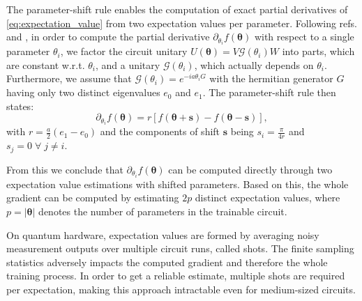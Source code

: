 The parameter-shift rule enables the computation of exact partial derivatives of \cref{eq:expectation_value} from two expectation values per parameter.
Following refs. \cite{Schuld19} and \cite{Crooks19}, in order to compute the partial derivative \(\partial_{\theta_i}f(\bm{\theta})\) with respect to a single parameter \(\theta_i\), we factor the circuit unitary $U(\bm{\theta}) = V\mathcal{G}(\theta_i)W$ into parts, which are constant w.r.t. \(\theta_i\), and a unitary \(\mathcal{G}(\theta_i)\), which actually depends on \(\theta_i\). Furthermore, we assume that $\mathcal{G}(\theta_i) = e^{-ia\theta_i G}$ with the hermitian generator $G$ having only two distinct eigenvalues $e_0$ and $e_1$. The parameter-shift rule then states: %
\begin{equation}
\label{eq:param_shift}
    \partial_{\theta_i} f(\bm{\theta}) = r \left[ f(\bm{\theta} + \bm{s}) -  f(\bm{\theta} - \bm{s})\right],
\end{equation}
with $r = \frac{a}{2}(e_1 - e_0)$ and the components of shift $\bm{s}$ being $s_i = \frac{\pi}{4r}$ and $s_j = 0 \; \forall \; j \neq i$.

From this we conclude that $\partial_{\theta_i} f(\bm{\theta})$ can be computed directly through two expectation value estimations with shifted parameters. Based on this, the whole gradient can be computed by estimating $2p$ distinct expectation values, where $p = |\bm{\theta}|$ denotes the number of parameters in the trainable circuit.

On quantum hardware, expectation values are formed by averaging noisy measurement outputs over multiple circuit runs, called shots. The finite sampling statistics adversely impacts the computed gradient and therefore the whole training process. In order to get a reliable estimate, multiple shots are required per expectation, making this approach intractable even for medium-sized circuits.%

